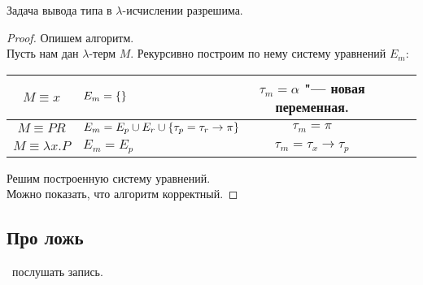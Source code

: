 \begin{theorem}
    Задача вывода типа в $\lambda$-исчислении разрешима.
\end{theorem}

\begin{proof}
    Опишем алгоритм. \\
    Пусть нам дан $\lambda$-терм $M$. Рекурсивно построим по нему систему уравнений $E_m$:
    \begin{center}
    \begin{tabular}{Sl Sl Sl} \hline
        $M \equiv x$ & $E_m=\left\{\right\}$ & $\tau_m=\alpha$ "--- новая переменная. \\ \hline
        $M \equiv PR$ & $E_m=E_p \cup E_r \cup \left\{\tau_p=\tau_r\rightarrow\pi\right\}$ & $\tau_m=\pi$ \\ \hline
        $M \equiv \lambda x . P$ & $E_m=E_p$ & $\tau_m=\tau_x\rightarrow\tau_p$ \\ \hline
    \end{tabular}
    \end{center}
    Решим построенную систему уравнений.\\
    Можно показать, что алгоритм корректный.
\end{proof}

\begin{example}
    \todo %
\end{example}

\subsection{\texorpdfstring{Про ложь}{About false}}

\todo\ послушать запись. %
